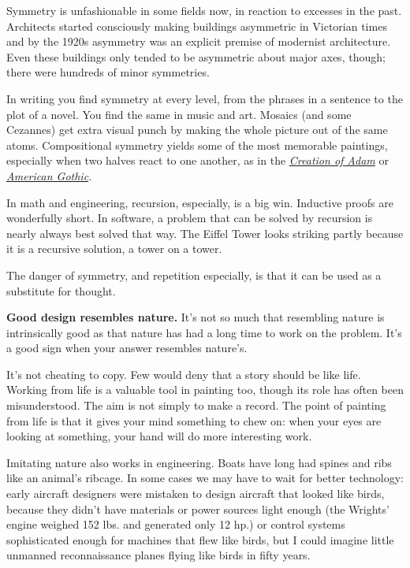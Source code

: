 \documentclass[12pt]{book}
\begin{document}
Symmetry is unfashionable in some fields now, in reaction to excesses in
the past. Architects started consciously making buildings asymmetric in
Victorian times and by the 1920s asymmetry was an explicit premise of
modernist architecture. Even these buildings only tended to be
asymmetric about major axes, though; there were hundreds of minor
symmetries.

In writing you find symmetry at every level, from the phrases in a
sentence to the plot of a novel. You find the same in music and art.
Mosaics (and some Cezannes) get extra visual punch by making the whole
picture out of the same atoms. Compositional symmetry yields some of the
most memorable paintings, especially when two halves react to one
another, as in the \emph{\href{symptg.html}{Creation of Adam}} or
\emph{\href{symptg.html}{American Gothic}.}

In math and engineering, recursion, especially, is a big win. Inductive
proofs are wonderfully short. In software, a problem that can be solved
by recursion is nearly always best solved that way. The Eiffel Tower
looks striking partly because it is a recursive solution, a tower on a
tower.

The danger of symmetry, and repetition especially, is that it can be
used as a substitute for thought.

\textbf{Good design resembles nature.} It's not so much that resembling
nature is intrinsically good as that nature has had a long time to work
on the problem. It's a good sign when your answer resembles nature's.

It's not cheating to copy. Few would deny that a story should be like
life. Working from life is a valuable tool in painting too, though its
role has often been misunderstood. The aim is not simply to make a
record. The point of painting from life is that it gives your mind
something to chew on: when your eyes are looking at something, your hand
will do more interesting work.

Imitating nature also works in engineering. Boats have long had spines
and ribs like an animal's ribcage. In some cases we may have to wait for
better technology: early aircraft designers were mistaken to design
aircraft that looked like birds, because they didn't have materials or
power sources light enough (the Wrights' engine weighed 152 lbs. and
generated only 12 hp.) or control systems sophisticated enough for
machines that flew like birds, but I could imagine little unmanned
reconnaissance planes flying like birds in fifty years.
\end{document}
